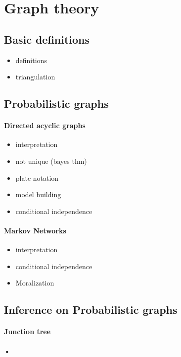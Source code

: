 \section{Graph theory}
\subsection{Basic definitions}
\begin{itemize}
\item definitions
\item triangulation
\end{itemize}
\subsection{Probabilistic graphs}
\paragraph*{Directed acyclic graphs}
\begin{itemize}
\item interpretation
\item not unique (bayes thm)
\item plate notation
\item model building
\item conditional independence
\end{itemize}
\paragraph*{Markov Networks}
\begin{itemize}
\item interpretation
\item conditional independence
\item Moralization
\end{itemize}
\subsection{Inference on Probabilistic graphs}
\paragraph*{Junction tree}
\paragraph*{•}